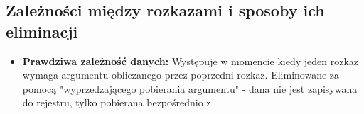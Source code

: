 \documentclass[a4paper,twoside]{article}
\begin{document}
		
        \subsection*{Zależności między rozkazami i sposoby ich eliminacji}
        	\begin{itemize}
            \item \textbf{Prawdziwa zależność danych:} Występuje w momencie kiedy jeden rozkaz wymaga argumentu obliczanego przez poprzedni rozkaz. Eliminowane za pomocą "wyprzedzającego pobierania argumentu" - dana nie jest zapisywana do rejestru, tylko pobierana bezpośrednio z 
            \end{itemize}
	
\end{document}
